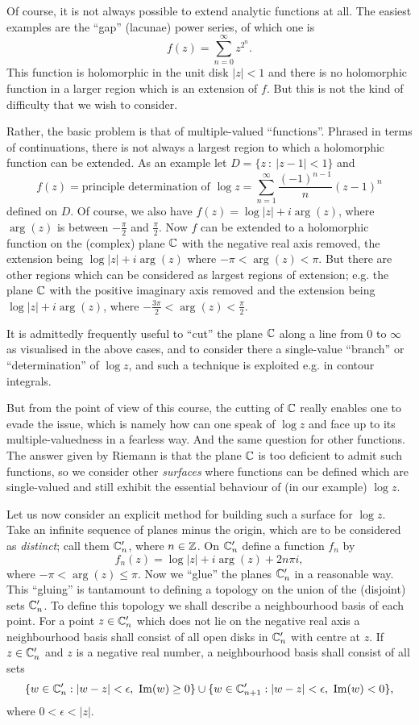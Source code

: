 \documentclass[a4paper,11pt]{article}
\begin{document}
Of course, it is not always possible to extend analytic functions at
all.  The easiest examples are the ``gap'' (lacunae)  power series, of
which one is
$$
f(z) = \sum_{n=0}^{\infty} z^{2^n}.
$$
This function is holomorphic in the unit disk $|z|<1$ and there is no
holomorphic function in a larger region which is an extension of $f$.
But this is not the kind of difficulty that we wish to consider.

Rather, the basic problem is that of multiple-valued ``functions''.
Phrased in terms of continuations, there is not always a largest
region to which a holomorphic function can be extended.  As an example
let $D = \{z ~:~ |z-1| < 1\}$ and 
$$
f(z) = \text{principle determination of }\log z
= \sum_{n=1}^{\infty} \frac{(-1)^{n-1}}{n} (z-1)^n
$$
defined on $D$.  Of course, we also have $f(z) = \log|z| + i\arg(z)$,
where $\arg(z)$ is between $-\frac{\pi}{2}$ and $\frac{\pi}{2}$.  Now
$f$ can be extended to a holomorphic function on the (complex) plane
${\mathbb C}$ with the negative real axis removed, the extension being
$\log|z| + i\arg(z)$ where $-\pi < \arg(z) < \pi$.  But there are
other regions which can be considered as largest regions of extension;
e.g. the plane ${\mathbb C}$ with the positive imaginary axis removed and the
extension being $\log|z| + i\arg(z)$, where $-\frac{3\pi}{2} < \arg(z)
< \frac{\pi}{2}$.

It is admittedly frequently useful to ``cut'' the plane ${\mathbb C}$ along a
line from 0 to $\infty$ as visualised in the above cases, and to
consider there a single-value ``branch'' or ``determination'' of $\log
z$, and such a technique is exploited e.g. in contour integrals.

But from the point of view of this course, the cutting of ${\mathbb C}$ really
enables one to evade the issue, which is namely how can one speak of
$\log z$ and face up to its multiple-valuedness in a fearless way.
And the same question for other functions.  The answer given by
Riemann is that the plane ${\mathbb C}$ is too deficient to admit such
functions, so we consider other \emph{surfaces} where functions can be
defined which are single-valued and still exhibit the essential
behaviour of (in our example) $\log z$.

Let us now consider an explicit method for building such a surface for
$\log z$.  Take an infinite sequence of planes minus the origin, which
are to be considered as \emph{distinct}; call them ${\mathbb C}_n'$, where $n
\in {\mathbb Z}$.  On ${\mathbb C}_n'$ define a function $f_n$ by
$$
f_n(z) = \log|z| + i\arg(z) + 2n\pi i,
$$
where $-\pi < \arg(z) \le \pi$.  Now we ``glue'' the planes ${\mathbb C}_n'$
in a reasonable way.  This ``gluing'' is tantamount to defining a
topology on the union of the (disjoint) sets ${\mathbb C}_n'$.  To define
this topology we shall describe a neighbourhood basis of each point.
For a point $z \in {\mathbb C}_n'$ which does not lie on the negative real
axis a neighbourhood basis shall consist of all open disks in
${\mathbb C}_n'$ with centre at $z$.  If $z\in {\mathbb C}_n'$ and $z$ is a negative
real number, a neighbourhood basis shall consist of all sets
$$
\{w \in \CCC_n' : |w-z|<\epsilon,\ \Im(w)\ge0\} \cup
\{w \in \CCC_{n+1}' : |w-z|<\epsilon,\ \Im(w)<0\},
$$
where $0 < \epsilon < |z|$.
\end{document}

